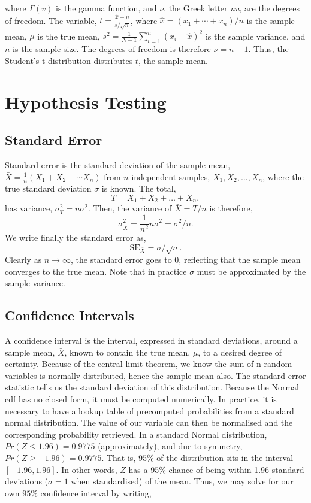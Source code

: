 \documentclass[11pt]{amsart}
\begin{document}
where $\Gamma(v)$ is the gamma function, and $\nu$, the Greek letter \emph{nu}, are the degrees of freedom. The variable, $t = \frac{\hat{x} - \mu}{s/\sqrt{n}}$, where $\hat{x} = (x_1 + \cdots + x_n)/n$ is the sample mean, $\mu$ is the true mean, $s^2 = \frac{1}{N - 1}\sum_{i=1}^{n} (x_i - \hat{x})^2$ is the sample variance, and $n$ is the sample size. The degrees of freedom is therefore $\nu = n - 1$. Thus, the Student's t-distribution distributes $t$, the sample mean.

\section{Hypothesis Testing}

\subsection{Standard Error}

Standard error is the standard deviation of the sample mean, $\bar{X} = \frac{1}{n}(X_1 + X_2 + \cdots X_n)$ from $n$ independent samples, $X_1, X_2, \dots, X_n$, where the true standard deviation $\sigma$ is known. The total, $$T = X_1 + X_2 + \dots + X_n,$$ has variance, $\sigma_T^2 = n\sigma^2$. Then, the variance of $\bar{X} = T/n$ is therefore, $$\sigma_{\bar{X}}^2 = \frac{1}{n^2}n\sigma^2 = \sigma^2/n.$$ We write finally the standard error as, $$\text{SE}_{\bar{X}} = \sigma/\sqrt{n}.$$ Clearly as $n \to \infty$, the standard error goes to $0$, reflecting that the sample mean converges to the true mean. Note that in practice $\sigma$ must be approximated by the sample variance.

\subsection{Confidence Intervals}

A confidence interval is the interval, expressed in standard deviations, around a sample mean, $\bar{X}$, known to contain the true mean, $\mu$, to a desired degree of certainty. Because of the central limit theorem, we know the sum of n random variables is normally distributed, hence the sample mean also. The standard error statistic tells us the standard deviation of this distribution. Because the Normal cdf has no closed form, it must be computed numerically. In practice, it is necessary to have a lookup table of precomputed probabilities from a standard normal distribution. The value of our variable can then be normalised and the corresponding probability retrieved. In a standard Normal distribution, $Pr(Z \leq 1.96) = 0.9775$ (approximately), and due to symmetry, $Pr(Z \geq - 1.96) = 0.9775$. That is, $95\%$ of the distribution sits in the interval $[-1.96, 1.96]$. In other words, $Z$ has a 95\% chance of being within 1.96 standard deviations ($\sigma = 1$ when standardised) of the mean. Thus, we may solve for our own $95\%$ confidence interval by writing,
\end{document}
